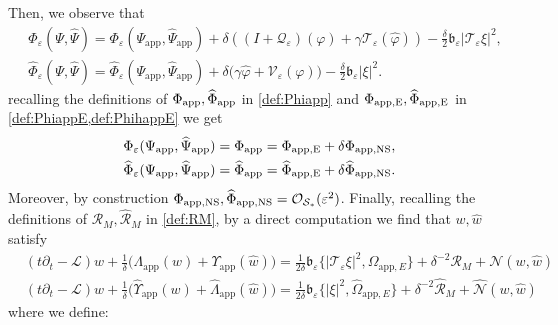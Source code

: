 \documentclass[11pt,reqno,a4paper]{amsart}
\def\eps{\varepsilon}
\def\de{{\partial}}
\newcommand{\cL}{\mathcal{L}}
\newcommand{\cN}{\mathcal{N}}
\newcommand{\cO}{\mathcal{O}}
\newcommand{\cQ}{\mathcal{Q}}
\newcommand{\cR}{\mathcal{R}}
\newcommand{\cS}{\mathcal{S}}
\newcommand{\cT}{\mathcal{T}}
\newcommand{\cV}{\mathcal{V}}
\newcommand{\app}{\mathrm{app}}
\newcommand{\1}{\mathbbm{1}}
\theoremstyle{definition}
\theoremstyle{definition}
\numberwithin{equation}{section}
\begin{document}
Then, we observe that 
\begin{align}
&\Phi_{\eps}(\Psi,\widehat{\Psi})=\Phi_{\eps}(\Psi_{\app},\widehat{\Psi}_{\app})+\delta((I+\cQ_{\eps})(\varphi)+ \gamma \cT_\eps(\widehat{\varphi}))-\frac{\delta}{2}\mathfrak{b}_\eps|\cT_\eps\xi|^2,\\
&\widehat{\Phi}_{\eps}(\Psi,\widehat{\Psi})=\widehat{\Phi}_{\eps}(\Psi_{\app},\widehat{\Psi}_{\app})+  \delta\big(\gamma\widehat{\varphi}+\cV_{\eps}(\varphi)\big)-\frac{\delta}{2}\mathfrak{b}_\eps|\xi|^2.
\end{align}
recalling the definitions of $\Phi_{\rm app}, \widehat{\Phi}_{\rm app}$ in \cref{def:Phiapp} 
and $\Phi_{\rm app, E}, \widehat{\Phi}_{\rm app,E}$ in \cref{def:PhiappE,def:PhihappE} we get
\begin{align}
&\Phi_{\eps}(\Psi_{\app},\widehat{\Psi}_{\app})=\Phi_{\rm app}=\Phi_{\rm app, E}+\delta \Phi_{\rm app, NS}, \\
&\widehat{\Phi}_{\eps}(\Psi_{\app},\widehat{\Psi}_{\app})=\widehat{\Phi}_{\rm app}=\widehat{\Phi}_{\rm app, E}+\delta \widehat{\Phi}_{\rm app, NS}.
\end{align}
Moreover, by construction $\Phi_{\rm app, NS}, \widehat{\Phi}_{\rm app, NS}=\cO_{\cS_*}(\eps^2)$. 
Finally, recalling the definitions of $\cR_M,\widehat{\cR}_M$ in \cref{def:RM},
by a direct computation we find that $w,\widehat{w}$ satisfy 
\begin{align}
   \label{eq:w} &(t\de_t-\cL)w+\frac{1}{\delta}\big(\Lambda_{\app}(w)+\Upsilon_{\app}(\widehat{w})\big)=\frac{1}{2\delta}\mathfrak{b}_\eps\{|\cT_{\eps} \xi|^2,\Omega_{\app,E}\}+\delta^{-2}\cR_M+\cN(w,\widehat{w})\\
     \label{eq:hw}&(t\de_t-\cL)\widehat{w}+\frac{1}{\delta}\big(\widehat{\Upsilon}_{\app}(w)+\widehat{\Lambda}_{\app}(\widehat{w})\big)=\frac{1}{2\delta}\mathfrak{b}_\eps\{|\xi|^2,\widehat{\Omega}_{\app,E}\}+\delta^{-2}\widehat{\cR}_M+\widehat{\cN}(w,\widehat{w})
     \end{align}
where we define:
\end{document}
